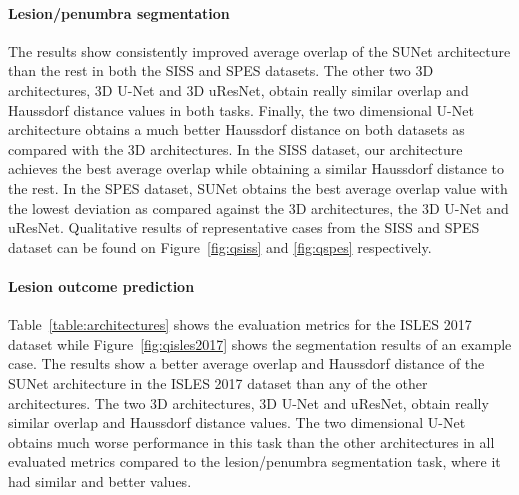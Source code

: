 \documentclass[letterpaper,final,authoryear,3p,times,twocolumn]{elsarticle}
\begin{document}
\paragraph{Lesion/penumbra segmentation} The results show consistently improved average overlap of the SUNet architecture than the rest in both the SISS and SPES datasets. The other two 3D architectures, 3D U-Net and 3D uResNet, obtain really similar overlap and Haussdorf distance values in both tasks. Finally, the two dimensional U-Net architecture obtains a much better Haussdorf distance on both datasets as compared with the 3D architectures. In the SISS dataset, our architecture achieves the best average overlap while obtaining a similar Haussdorf distance to the rest. In the SPES dataset, SUNet obtains the best average overlap value with the lowest deviation as compared against the 3D architectures, the 3D U-Net and uResNet. Qualitative results of representative cases from the SISS and SPES dataset can be found on Figure~\ref{fig:qsiss} and \ref{fig:qspes} respectively.



\paragraph{Lesion outcome prediction} Table~\ref{table:architectures} shows the evaluation metrics for the ISLES 2017 dataset while Figure~\ref{fig:qisles2017} shows the segmentation results of an example case. The results show a better average overlap and Haussdorf distance of the SUNet architecture in the ISLES 2017 dataset than any of the other architectures. The two 3D architectures, 3D U-Net and uResNet, obtain really similar overlap and Haussdorf distance values. The two dimensional U-Net obtains much worse performance in this task than the other architectures in all evaluated metrics compared to the lesion/penumbra segmentation task, where it had similar and better values.

%
\end{document}
